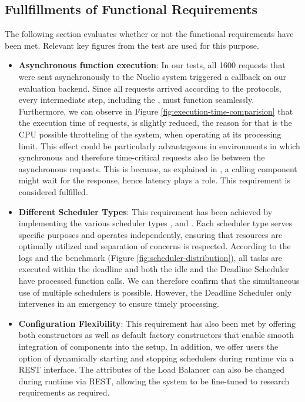 \subsection*{Fullfillments of Functional Requirements}
The following section evaluates whether or not the functional requirements have been met. Relevant key figures from the test are used for this purpose. 
\begin{itemize}
    \item \textbf{Asynchronous function execution}: In our tests, all 1600 requests that were sent asynchronously to the Nuclio system triggered a callback on our evaluation backend. Since all requests arrived according to the protocols, every intermediate step, including the , must function seamlessly. 
    Furthermore, we can observe in Figure \ref{fig:execution-time-comparision} that the execution time of requests, is slightly reduced, the reason for that is the CPU possible throtteling of the system, when operating at its processing limit. This effect could be particularly advantageous in environments in which synchronous and therefore time-critical requests also lie between the asynchronous requests. This is because, as explained in , a calling component might wait for the response, hence latency plays a role. 
    This requirement is considered fulfilled.
    
    \item \textbf{Different Scheduler Types}: This requirement has been achieved by implementing the various scheduler types ,  and . Each scheduler type serves specific purposes and operates independently, ensuring that resources are optimally utilized and separation of concerns is respected. According to the logs and the benchmark (Figure \ref{fig:scheduler-distribution}), all tasks are executed within the deadline and both the idle and the Deadline Scheduler have processed function calls. We can therefore confirm that the simultaneous use of multiple schedulers is possible. However, the Deadline Scheduler only intervenes in an emergency to ensure timely processing.
    
    \item \textbf{Configuration Flexibility}: This requirement has also been met by offering both constructors as well as default factory constructors that enable smooth integration of components into the setup. In addition, we offer users the option of dynamically starting and stopping schedulers during runtime via a REST interface. The attributes of the Load Balancer can also be changed during runtime via REST, allowing the system to be fine-tuned to research requirements as required.
\end{itemize}

